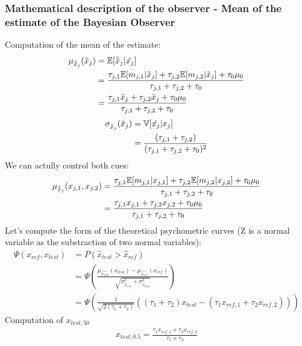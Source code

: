 \documentclass{article}
\begin{document}
\subsubsection*{Mathematical description of the observer - Mean of the estimate of the Bayesian Observer}
Computation of the mean of the estimate:\\
\begin{align*}
    \mu_{\hat{\Tilde{x}}_j}(\Tilde{x}_j)&= \mathbb{E}[\hat{\Tilde{x}}_j |\Tilde{x_j}] \\
    &= \frac{\tau_{j,1}\mathbb{E}[m_{j,1} |\Tilde{x}_j] + \tau_{j,2}\mathbb{E}[m_{j,2} |\Tilde{x}_j]+\tau_0\mu_0 }{\tau_{j,1}+\tau_{j,2}+\tau_0 }\\
    &= \frac{\tau_{j,1}\Tilde{x}_j +\tau_{j,2}\Tilde{x}_j +\tau_0\mu_0 }{\tau_{j,1}+\tau_{j,2}+\tau_0 }\\
\end{align*}
\begin{align*}
    \sigma_{\hat{\Tilde{x}}_j}(\Tilde{x}_j) &= \mathbb{V}[\hat{x_j} |x_j] \\
    &= \frac{(\tau_{j,1}+\tau_{j,2}) }{(\tau_{j,1}+\tau_{j,2}+\tau_0)^2}\\
\end{align*}
We can actully control both cues:\\
\begin{align*}
    \mu_{\hat{\Tilde{x}}_j}(x_{j,1}, x_{j,2}) &= \frac{\tau_{j,1}\mathbb{E}[m_{j,1} |x_{j,1}] + \tau_{j,2}\mathbb{E}[m_{j,2} |x_{j,2}]+\tau_0\mu_0 }{\tau_{j,1}+\tau_{j,2}+\tau_0 }\\
    &= \frac{\tau_{j,1}x_{j,1} +\tau_{j,2}x_{j,2} +\tau_0\mu_0 }{\tau_{j,1}+\tau_{j,2}+\tau_0 }\\
\end{align*}
Let's compute the form of the theoretical psychometric curves (Z is a normal variable as the substraction of two normal variables):\\
\begin{align*}
    \Psi(x_{ref},x_{test}) &= P(\hat{x}_{test} > \hat{x}_{ref})\\
    &= \Psi \left( \frac{\mu_{\hat{x_{test}}}(x_{test})-\mu_{\hat{x_{ref}}}(x_{ref})}{\sqrt{\sigma^2_{\hat{x}_{ref}}+\sigma^2_{\hat{x}_{test}}}} \right)\\
    &= \Psi \left( \frac{1}{\sqrt{2(\tau_1+\tau_2)}} \left( (\tau_1+\tau_2)x_{test}-(\tau_1 x_{ref,1}+\tau_2 x_{ref,2}) \right) \right)
\end{align*}
Computation of $x_{test,50}$
\begin{align*}
    x_{test,0.5} = \frac{\tau_1x_{ref,1}+\tau_2x_{ref,2}}{\tau_1+\tau_2}
\end{align*}
\end{document}
